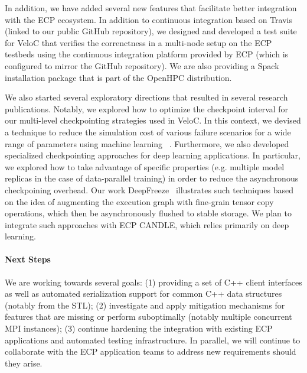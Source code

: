 In addition, we have added several new features that facilitate better
integration with the ECP ecosystem. In addition to continuous
integration based on Travis (linked to our public GitHub repository),
we designed and developed a test suite for VeloC that verifies the
correnctness in a multi-node setup on the ECP testbeds using the
continuous integration platform provided by ECP (which is configured to
mirror the GitHub repository). We are also providing a Spack
installation package that is part of the OpenHPC distribution.

We also started several exploratory directions that resulted in
several research publications. Notably, we explored how to optimize
the checkpoint interval for our multi-level checkpointing strategies
used in VeloC. In this context, we devised a technique to reduce the
simulation cost of various failure scenarios for a wide range of
parameters using machine learning ~\cite{MLCkpt20}. Furthermore, we
also developed specialized checkpointing approaches for deep learning
applications.  In particular, we explored how to take advantage of
specific properties (e.g. multiple model replicas in the case of
data-parallel training) in order to reduce the asynchronous
checkpoining overhead. Our work DeepFreeze~\cite{DeepFreeze20}
illustrates such techniques based on the idea of augmenting the
execution graph with fine-grain tensor copy operations, which then be
asynchronously flushed to stable storage. We plan to integrate such
approaches with ECP CANDLE, which relies primarily on deep learning.

\paragraph{Next Steps}
We are working towards several goals: (1) providing a set of C++
client interfaces as well as automated serialization support for
common C++ data structures (notably from the STL); (2)
investigate and apply mitigation mechanisms for features that
are missing or perform suboptimally (notably multiple concurrent 
MPI instances); (3) continue hardening the integration with
existing ECP applications and automated testing infrastructure.
In parallel, we will continue to collaborate with the ECP application
teams to address new requirements should they arise.